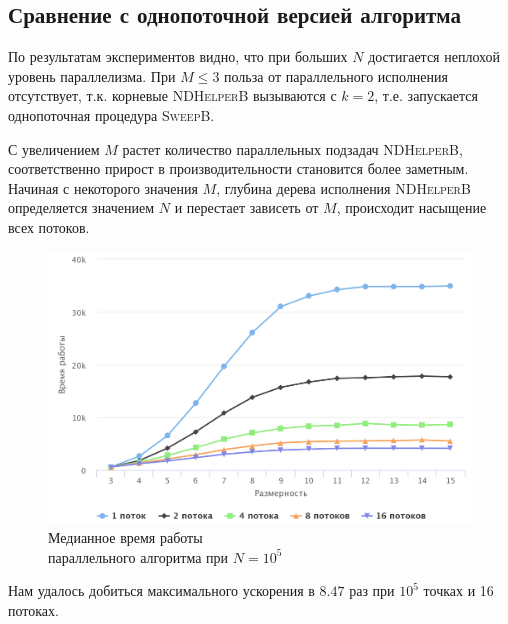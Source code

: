 \subsection{Сравнение с однопоточной версией алгоритма}
По результатам экспериментов видно, что при больших $N$ достигается неплохой уровень параллелизма.
При $M\leq3$ польза от параллельного исполнения отсутствует, т.к. корневые \textsc{NDHelperB} вызываются с $k=2$, т.е. запускается однопоточная процедура \textsc{SweepB}.

С увеличением $M$ растет количество параллельных подзадач \textsc{NDHelperB}, соответственно прирост в производительности становится более заметным.
Начиная с некоторого значения $M$, глубина дерева исполнения \textsc{NDHelperB} определяется значением $N$ и перестает зависеть от $M$, происходит насыщение всех потоков.

\begin{figure}[h!]
\centering
\includegraphics[width=\textwidth]{images/100k.png}
\caption{Медианное время работы\\параллельного алгоритма при $N=10^5$}
\end{figure}

Нам удалось добиться максимального ускорения в $8.47$ раз при $10^5$ точках и 16 потоках.

